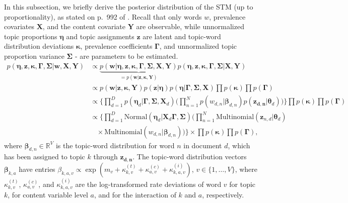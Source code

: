 In this subsection, we briefly derive the posterior distribution of the STM (up to proportionality), as stated on p.\ 992 of \cite{roberts2016model}. Recall that only words $w$, prevalence covariates $\boldsymbol{X}$, and the content covariate $\boldsymbol{Y}$ are observable, while unnormalized topic proportions $\boldsymbol{\eta}$ and topic assignments $\boldsymbol{z}$ are latent and topic-word distribution deviations $\boldsymbol{\kappa}$, prevalence coefficients $\boldsymbol{\Gamma}$, and unnormalized topic proportion variance $\boldsymbol{\Sigma}$ - are parameters to be estimated.
\begin{align*}
p(\boldsymbol{\eta}, \boldsymbol{z}, \boldsymbol{\kappa}, \boldsymbol{\Gamma}, \boldsymbol{\Sigma} | \boldsymbol{w}, \boldsymbol{X}, \boldsymbol{Y}) & \propto \underbrace{p(\boldsymbol{w} | \boldsymbol{\eta}, \boldsymbol{z}, \boldsymbol{\kappa}, \boldsymbol{\Gamma}, \boldsymbol{\Sigma}, \boldsymbol{X}, \boldsymbol{Y})}_{=p(\boldsymbol{w} | \boldsymbol{z}, \boldsymbol{\kappa}, \boldsymbol{Y})} p(\boldsymbol{\eta}, \boldsymbol{z}, \boldsymbol{\kappa}, \boldsymbol{\Gamma}, \boldsymbol{\Sigma} | \boldsymbol{X}, \boldsymbol{Y}) \\
& \propto p(\boldsymbol{w} | \boldsymbol{z}, \boldsymbol{\kappa}, \boldsymbol{Y}) p(\boldsymbol{z} | \boldsymbol{\eta}) p(\boldsymbol{\eta} | \boldsymbol{\Gamma}, \boldsymbol{\Sigma}, \boldsymbol{X}) \prod p(\boldsymbol{\kappa}) \prod p(\boldsymbol{\Gamma}) \\
& \propto \Big\{ \prod_{d=1}^{D} p(\boldsymbol{\eta}_d | \boldsymbol{\Gamma}, \boldsymbol{\Sigma}, \boldsymbol{X}_d) \Big( \prod_{n=1}^{N} p(w_{d,n} | \boldsymbol{\beta}_{d, n}) p(\boldsymbol{z_{d,n}} | \boldsymbol{\theta}_d) \Big) \Big\} \prod p(\boldsymbol{\kappa}) \prod p(\boldsymbol{\Gamma}) \\
& \propto \Big\{ \prod_{d=1}^{D} \text{Normal}(\boldsymbol{\eta}_d | \boldsymbol{X}_d \boldsymbol{\Gamma}, \boldsymbol{\Sigma}) \Big( \prod_{n=1}^{N} \text{Multinomial}(\boldsymbol{z}_{n,d}| \boldsymbol{\theta}_d) \\
& \ \ \ \ \times \text{Multinomial}(w_{d,n} | \boldsymbol{\beta}_{d,n}) \Big) \Big\} \times \prod p(\boldsymbol{\kappa}) \prod p(\boldsymbol{\Gamma}),
\end{align*}
where $\boldsymbol{\beta}_{d, n} \in \mathbb{R}^V$ is the topic-word distribution for word $n$ in document $d$, which has been assigned to topic $k$ through $\boldsymbol{z_{d,n}}$. The topic-word distribution vectors $\boldsymbol{\beta}_{k,a}$ have entries $\beta_{k,a,v} \propto \exp(m_{v} + \kappa_{k,v}^{(t)} + \kappa_{a,v}^{(c)} + \kappa_{k, a,v}^{(i)})$, $v \in \{1,\dots,V\}$, where $\kappa_{k,v}^{(t)}$, $\kappa_{a,v}^{(c)}$, and $\kappa_{k, a,v}^{(i)}$ are the log-transformed rate deviations of word $v$ for topic $k$, for content variable level $a$, and for the interaction of $k$ and $a$, respectively.

